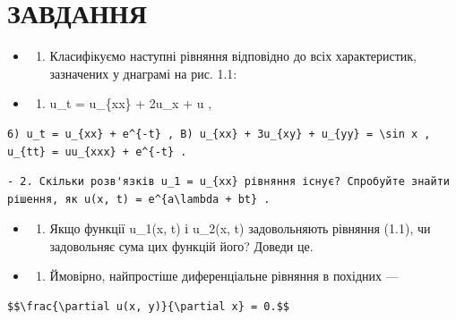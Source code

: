 \documentclass[
  ukrainian,
]{article}
\providecommand{\tightlist}{%
  \setlength{\itemsep}{0pt}\setlength{\parskip}{0pt}}
\begin{document}
\section{ЗАВДАННЯ}\label{ux437ux430ux432ux434ux430ux43dux43dux44f}

\begin{itemize}
\tightlist
\item
  \begin{enumerate}
  \def\labelenumi{\arabic{enumi}.}
  \tightlist
  \item
    Класифікуємо наступні рівняння відповідно до всіх характеристик,
    зазначених у днаграмі на рис. 1.1:
  \end{enumerate}
\item
  \begin{enumerate}
  \def\labelenumi{\alph{enumi})}
  \tightlist
  \item
    u\_t = u\_\{xx\} + 2u\_x + u ,
  \end{enumerate}
\end{itemize}

\begin{verbatim}
6) u_t = u_{xx} + e^{-t} , B) u_{xx} + 3u_{xy} + u_{yy} = \sin x , u_{tt} = uu_{xxx} + e^{-t} .
\end{verbatim}

\begin{verbatim}
- 2. Скільки розв'язків u_1 = u_{xx} рівняння існує? Спробуйте знайти рішення, як u(x, t) = e^{a\lambda + bt} .
\end{verbatim}

\begin{itemize}
\tightlist
\item
  \begin{enumerate}
  \def\labelenumi{\arabic{enumi}.}
  \setcounter{enumi}{2}
  \tightlist
  \item
    Якщо функції u\_1(x, t) і u\_2(x, t) задовольняють рівняння (1.1),
    чи задовольняє сума цих функцій його? Доведи це.
  \end{enumerate}
\item
  \begin{enumerate}
  \def\labelenumi{\arabic{enumi}.}
  \setcounter{enumi}{3}
  \tightlist
  \item
    Ймовірно, найпростіше диференціальне рівняння в похідних ---
  \end{enumerate}
\end{itemize}

\begin{verbatim}
$$\frac{\partial u(x, y)}{\partial x} = 0.$$
\end{verbatim}
\end{document}
